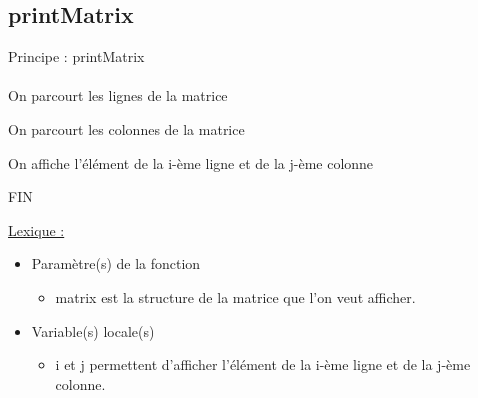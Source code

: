 \documentclass[a4paper]{article}
\newcommand\tab[1][1cm]{\hspace*{#1}}
\begin{document}
\subsection{printMatrix}
\begin{algorithm}
Principe : printMatrix
\\
\\
\tab On parcourt les lignes de la matrice

\tab \tab On parcourt les colonnes de la matrice 

\tab \tab \tab On affiche l'élément de la i-ème ligne et de la j-ème colonne 

FIN
\end{algorithm}

\underline{Lexique :}
\begin{itemize}
\item Paramètre(s) de la fonction  
\begin{itemize}
\item matrix est la structure de la matrice que l'on veut afficher.
\end{itemize}
\item Variable(s) locale(s)
\begin{itemize}
\item i et j permettent d'afficher l'élément de la i-ème ligne et de la j-ème colonne.
\end{itemize}
\end{itemize}
\end{document}
